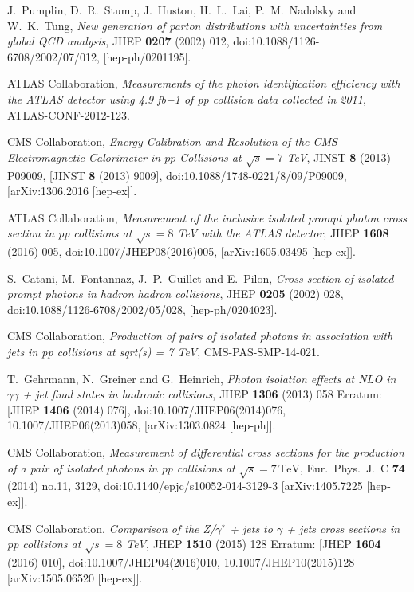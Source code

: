 \documentclass{PoS}
\begin{document}
\begin{thebibliography}{99}
  J.~Pumplin, D.~R.~Stump, J.~Huston, H.~L.~Lai, P.~M.~Nadolsky and W.~K.~Tung,
  {\it New generation of parton distributions with uncertainties from global QCD analysis},
  JHEP {\bf 0207} (2002) 012,
  doi:10.1088/1126-6708/2002/07/012,
  [hep-ph/0201195].

  ATLAS Collaboration,
  {\it Measurements of the photon identification efficiency with the ATLAS detector using 4.9 fb−1 of pp collision data collected in 2011},
  ATLAS-CONF-2012-123.

  CMS Collaboration,
  {\it Energy Calibration and Resolution of the CMS Electromagnetic Calorimeter in $pp$ Collisions at $\sqrt{s} = 7$ TeV},
  JINST {\bf 8} (2013) P09009,
   [JINST {\bf 8} (2013) 9009],
  doi:10.1088/1748-0221/8/09/P09009,
  [arXiv:1306.2016 [hep-ex]].

  ATLAS Collaboration,
  {\it Measurement of the inclusive isolated prompt photon cross section in pp collisions at $ \sqrt{s}=8 $ TeV with the ATLAS detector},
  JHEP {\bf 1608} (2016) 005,
  doi:10.1007/JHEP08(2016)005,
  [arXiv:1605.03495 [hep-ex]].

  S.~Catani, M.~Fontannaz, J.~P.~Guillet and E.~Pilon,
  {\it Cross-section of isolated prompt photons in hadron hadron collisions},
  JHEP {\bf 0205} (2002) 028,
  doi:10.1088/1126-6708/2002/05/028,
  [hep-ph/0204023].

  CMS Collaboration,
  {\it Production of pairs of isolated photons in association with jets in pp collisions at sqrt(s) = 7 TeV},
  CMS-PAS-SMP-14-021.

  T.~Gehrmann, N.~Greiner and G.~Heinrich,
  {\it Photon isolation effects at NLO in $\gamma \gamma$ + jet final states in hadronic collisions},
  JHEP {\bf 1306} (2013) 058
   Erratum: [JHEP {\bf 1406} (2014) 076],
  doi:10.1007/JHEP06(2014)076, 10.1007/JHEP06(2013)058,
  [arXiv:1303.0824 [hep-ph]].

  CMS Collaboration,
  {\it Measurement of differential cross sections for the production of a pair of isolated photons in pp collisions at $\sqrt{s}=7\,\text {TeV} $},
  Eur.\ Phys.\ J.\ C {\bf 74} (2014) no.11,  3129,
  doi:10.1140/epjc/s10052-014-3129-3
  [arXiv:1405.7225 [hep-ex]].

  CMS Collaboration,
  {\it Comparison of the Z/$\gamma$$^{∗}$ + jets to $\gamma$ + jets cross sections in pp collisions at $ \sqrt{s}=8 $ TeV},
  JHEP {\bf 1510} (2015) 128
   Erratum: [JHEP {\bf 1604} (2016) 010],
  doi:10.1007/JHEP04(2016)010, 10.1007/JHEP10(2015)128
  [arXiv:1505.06520 [hep-ex]].


\end{thebibliography}
\end{document}
